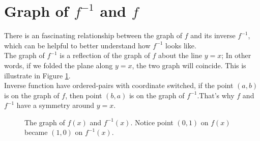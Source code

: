 \section{Graph of \texorpdfstring{$f^{-1}$}{TEXT} and    
            \texorpdfstring{$f$}{TEXT}}
There is an fascinating relationship between the graph of $f$ and its inverse $f^{-1}$, which can be helpful to better understand how $f^{-1}$ looks like.\\
The graph of $f^{-1}$ is a reflection of the graph of $f$ about the line $y=x$; In other words, if we folded the plane along $y=x$, the two graph will coincide. This is illustrate in Figure \ref{fig:graph_of_inv}.\\
Inverse function have ordered-pairs with coordinate switched, if the point $(a,b)$ is on the graph of $f$, then point $(b,a)$ is on the graph of $f^{-1}$.That's why $f$ and $f^{-1}$ have a symmetry around $y=x$. 
\begin{figure}[ht]
\begin{center}
\end{center}
\caption{The graph of $f(x)$ and $f^{-1}(x)$. Notice point $(0,1)$ on $f(x)$ became $(1,0)$ on $f^{-1}(x)$.}
\label{fig:graph_of_inv}
\end{figure}
%

